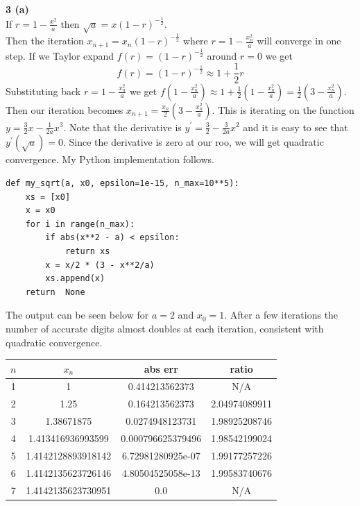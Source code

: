 \documentclass[12pt]{article}
\newcommand{\problem}[1]{\hspace{-4 ex} \large \textbf{#1}\\}
\begin{document}
\problem{3 (a)}
	If $r=1-\frac{x^2}{a}$ then $\sqrt{a} = x(1-r)^{-\frac{1}{2}}$. \\
	Then the iteration $x_{n+1} = x_n(1-r)^{-\frac{1}{2}}$ where $r=1-\frac{x_n^2}{a}$ will converge in one step. If we Taylor expand $f(r) = (1-r)^{-\frac{1}{2}}$ around $r=0$ we get
	$$
	f(r) = (1-r)^{-\frac{1}{2}} \approx 1 + \frac{1}{2}r
	$$
	Substituting back $r=1-\frac{x_n^2}{a}$ we get $f(1-\frac{x_n^2}{a}) \approx 1 + \frac{1}{2} (1-\frac{x_n^2}{a}) = \frac{1}{2}(3-\frac{x_n^2}{a})$. Then our iteration becomes $x_{n+1} = \frac{x_n}{2}(3-\frac{x_n^2}{a})$. This is iterating on the function $y=\frac{3}{2}x - \frac{1}{2a}x^3$. Note that the derivative is $y^\prime = \frac{3}{2} - \frac{3}{2a}x^2$ and it is easy to see that $y^\prime(\sqrt{a}) = 0$. Since the derivative is zero at our roo, we will get quadratic convergence. My Python implementation follows.
	\singlespacing
	\begin{lstlisting}
def my_sqrt(a, x0, epsilon=1e-15, n_max=10**5):
	xs = [x0]
	x = x0
	for i in range(n_max):
		if abs(x**2 - a) < epsilon:
			return xs
		x = x/2 * (3 - x**2/a)
		xs.append(x)
	return  None
	\end{lstlisting}\doublespacing
	
	The output can be seen below for $a=2$ and $x_0=1$. After a few iterations the number of accurate digits almost doubles at each iteration, consistent with quadratic convergence.
	
	\begin{center}
		\begin{tabular}{|c|c|c|c|}
			\hline
			$n$&$x_n$&abs err&ratio\\ \hline
			1&1&0.414213562373&N/A\\ \hline
			2&1.25&0.164213562373&2.04974089911\\ \hline
			3&1.38671875&0.0274948123731&1.98925208746\\ \hline
			4&1.413416936993599&0.000796625379496&1.98542199024\\ \hline
			5&1.4142128893918142&6.72981280925e-07&1.99177257226\\ \hline
			6&1.4142135623726146&4.80504525058e-13&1.99583740676\\ \hline
			7&1.4142135623730951&0.0&N/A\\ \hline
		\end{tabular}
	\end{center}
	
\end{document}

